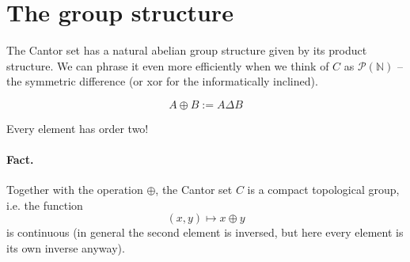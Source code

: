 \section{The group structure}

The Cantor set has a natural abelian group structure given by its product structure. We can phrase it even more efficiently when we think of \( C \) as \( \mathcal{P}( \mathbb{N} ) \) -- the symmetric difference (or xor for the informatically inclined).

\[ 
    A \oplus B := A \Delta B 
\]

Every element has order two!

\paragraph{Fact.} Together with the operation \( \oplus \), the Cantor set \( C \) is a compact topological group, i.e. the function
\[ 
    (x, y) \mapsto x \oplus y 
\]
is continuous (in general the second element is inversed, but here every element is its own inverse anyway).
